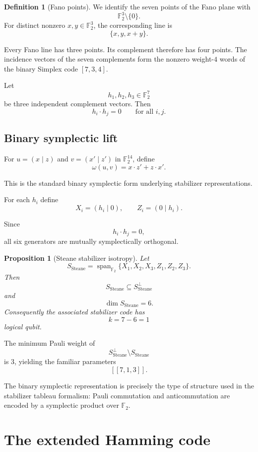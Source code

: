 \documentclass[11pt,a4paper]{article}
\newtheorem{proposition}[theorem]{Proposition}
\theoremstyle{definition}
\newtheorem{definition}[theorem]{Definition}
\theoremstyle{remark}
\newcommand{\F}{\mathbb F}
\newcommand{\Span}{\operatorname{span}}
\begin{document}
	\begin{definition}[Fano points]
		We identify the seven points of the Fano plane with
		\[
		\F_2^3\setminus\{0\}.
		\]
		For distinct nonzero $x,y\in\F_2^3$, the corresponding line is
		\[
		\{x,y,x+y\}.
		\]
	\end{definition}
	
	Every Fano line has three points.  Its complement therefore has four points.
	The incidence vectors of the seven complements form the nonzero weight-$4$
	words of the binary Simplex code $[7,3,4]$.
	
	Let
	\[
	h_1,h_2,h_3\in\F_2^7
	\]
	be three independent complement vectors.  Then
	\[
	h_i\cdot h_j=0
	\qquad
	\text{for all }i,j.
	\]
	
	\subsection{Binary symplectic lift}
	
	For $u=(x\mid z)$ and $v=(x'\mid z')$ in $\F_2^{14}$, define
	\[
	\omega(u,v)
	=
	x\cdot z'+z\cdot x'.
	\]
	
	This is the standard binary symplectic form underlying stabilizer
	representations.
	
	For each $h_i$ define
	\[
	X_i=(h_i\mid0),
	\qquad
	Z_i=(0\mid h_i).
	\]
	
	Since
	\[
	h_i\cdot h_j=0,
	\]
	all six generators are mutually symplectically orthogonal.
	
	\begin{proposition}[Steane stabilizer isotropy]
		Let
		\[
		S_{\mathrm{Steane}}
		=
		\Span_{\F_2}
		\{X_1,X_2,X_3,Z_1,Z_2,Z_3\}.
		\]
		Then
		\[
		S_{\mathrm{Steane}}
		\subseteq
		S_{\mathrm{Steane}}^\perp
		\]
		and
		\[
		\dim S_{\mathrm{Steane}}=6.
		\]
		Consequently the associated stabilizer code has
		\[
		k=7-6=1
		\]
		logical qubit.
	\end{proposition}
	
	The minimum Pauli weight of
	\[
	S_{\mathrm{Steane}}^\perp
	\setminus
	S_{\mathrm{Steane}}
	\]
	is $3$, yielding the familiar parameters
	\[
	[[7,1,3]].
	\]
	
	The binary symplectic representation is precisely the type of structure used
	in the stabilizer tableau formalism: Pauli commutation and anticommutation
	are encoded by a symplectic product over $\F_2$.
	
	\section{The extended Hamming code}
	
\end{document}
